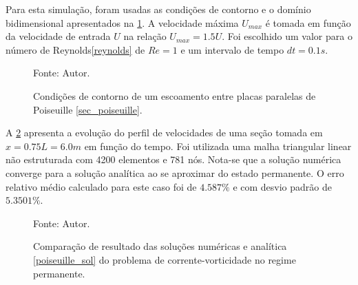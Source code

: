 Para esta simulação, foram usadas as condições de contorno e o domínio bidimensional apresentados na \ref{poiseuille_bc}.
A velocidade máxima $U_{max}$ é tomada em função da velocidade de entrada $U$ na relação $U_{max}=1.5U$.
Foi escolhido um valor para o número de Reynolds\eqref{reynolds} de $Re=1$ e um intervalo de tempo $dt=0.1s$.
\begin{figure}[H]
    \centering
     {\raggedleft \scriptsize Fonte: Autor.}
    \caption{Condições de contorno de um escoamento entre placas paralelas de Poiseuille \ref{sec_poiseuille}.}
    \label{poiseuille_bc}
\end{figure}

A \ref{poiseuille_comp} apresenta a evolução do perfil de velocidades de uma seção tomada em $x=0.75L=6.0m$ em função do tempo.
Foi utilizada uma malha triangular linear não estruturada com 4200 elementos e 781 nós.
Nota-se que a solução numérica converge para a solução analítica ao se aproximar do estado permanente.
O erro relativo médio calculado para este caso foi de $4.587\%$ e com desvio padrão de $5.3501\%$.
\begin{figure}[H]
    \centering
     {\raggedleft \scriptsize Fonte: Autor.}
    \caption{Comparação de resultado das soluções numéricas e analítica \ref{poiseuille_sol} do problema de corrente-vorticidade no regime permanente.}
    \label{poiseuille_comp}
\end{figure}

